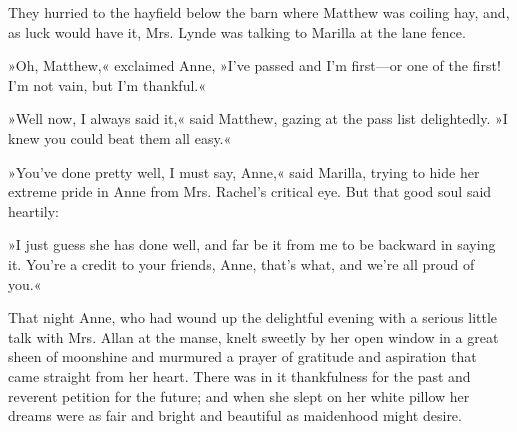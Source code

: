 They hurried to the hayfield below the barn where Matthew was coiling hay, and, as luck would have it, Mrs. Lynde was talking to Marilla at the lane fence.

»Oh, Matthew,« exclaimed Anne, »I've passed and I'm first—or one of the first! I'm not vain, but I'm thankful.«

»Well now, I always said it,« said Matthew, gazing at the pass list delightedly. »I knew you could beat them all easy.«

»You've done pretty well, I must say, Anne,« said Marilla, trying to hide her extreme pride in Anne from Mrs. Rachel's critical eye. But that good soul said heartily:

»I just guess she has done well, and far be it from me to be backward in saying it. You're a credit to your friends, Anne, that's what, and we're all proud of you.«

That night Anne, who had wound up the delightful evening with a serious little talk with Mrs. Allan at the manse, knelt sweetly by her open window in a great sheen of moonshine and murmured a prayer of gratitude and aspiration that came straight from her heart. There was in it thankfulness for the past and reverent petition for the future; and when she slept on her white pillow her dreams were as fair and bright and beautiful as maidenhood might desire.